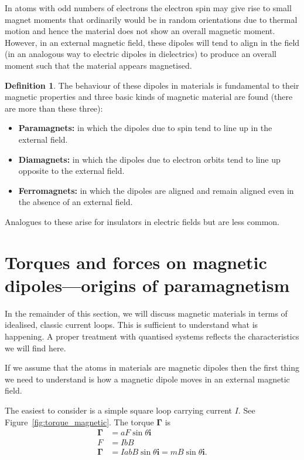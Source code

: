 \documentclass[12pt,chapterprefix=false,dvipsnames]{scrbook}
\theoremstyle{dotless}
\theoremstyle{definition}
\newtheorem{protodefinition}{Definition}[section]
\newenvironment{definition}
{\colorlet{shadecolor}{black!15}\begin{shaded}\begin{protodefinition}}
			{\end{protodefinition}\end{shaded}}
\begin{document}
In atoms with odd numbers of electrons the electron spin may
give rise to small magnet moments that ordinarily would be in
random orientations due to thermal motion and hence the material
does not show an overall magnetic moment. However, in an
external magnetic field, these dipoles will tend to align in the
field (in an analogous way to electric dipoles in dielectrics)
to produce an overall moment such that the material appears
magnetised.

\begin{definition}
	The behaviour of these dipoles in materials is fundamental to
	their magnetic properties and three basic kinds of magnetic
	material are found (there are more than these three):
	\begin{itemize}
		\item \textbf{Paramagnets:} in which the dipoles due to spin tend to
		      line up in the external field.
		\item \textbf{Diamagnets:} in which the dipoles due to electron
		      orbits tend to line up opposite to the external field.
		\item \textbf{Ferromagnets:} in which the dipoles are aligned and
		      remain aligned even in the absence of an external field.
	\end{itemize}
\end{definition}

Analogues to these arise for insulators in electric fields but
are less common.

\section{Torques and forces on magnetic dipoles---origins of
  paramagnetism}%
\label{sec:torques_and_forces_on_magnetic_dipoles_origins_of_paramagnetism}

In the remainder of this section, we will discuss magnetic
materials in terms of idealised, classic current loops. This is
sufficient to understand what is happening. A proper treatment
with quantised systems reflects the characteristics we will find
here.

If we assume that the atoms in materials are magnetic dipoles
then the first thing we need to understand is how a magnetic
dipole moves in an external magnetic field.

The easiest to consider is a simple square loop carrying current
$I$. See Figure~\ref{fig:torque_magnetic}.
The torque $\bm{\Gamma}$ is
\begin{equation}
	\begin{aligned}
		\bm{\Gamma} & = aF\sin{\theta}\bm{i }                          \\
		F           & = IbB                                            \\
		\bm{\Gamma} & = IabB\sin{\theta}\bm{i} = mB\sin{\theta}\bm{i}.
	\end{aligned}
\end{equation}
\end{document}
